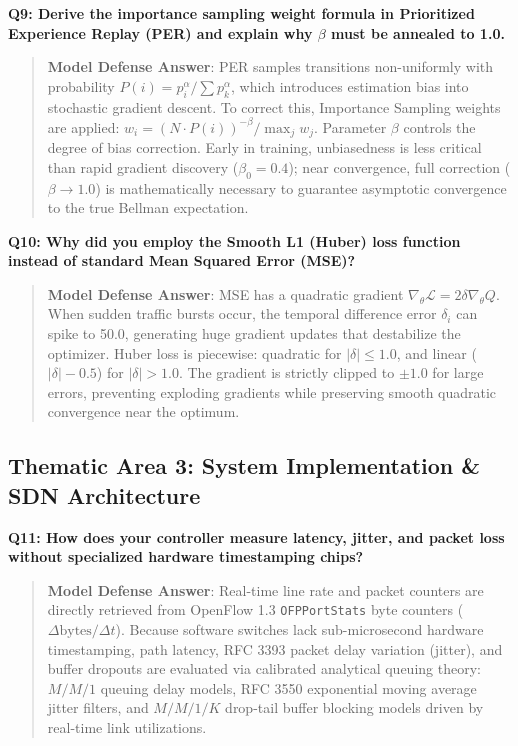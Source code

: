 \documentclass[12pt,a4paper,oneside]{report}
\begin{document}
\noindent\textbf{Q9: Derive the importance sampling weight formula in Prioritized Experience Replay (PER) and explain why $\beta$ must be annealed to 1.0.}
\begin{quote}
\small
\textbf{Model Defense Answer}: PER samples transitions non-uniformly with probability $P(i) = p_i^\alpha / \sum p_k^\alpha$, which introduces estimation bias into stochastic gradient descent. To correct this, Importance Sampling weights are applied: $w_i = (N \cdot P(i))^{-\beta} / \max_j w_j$. Parameter $\beta$ controls the degree of bias correction. Early in training, unbiasedness is less critical than rapid gradient discovery ($\beta_0 = 0.4$); near convergence, full correction ($\beta \to 1.0$) is mathematically necessary to guarantee asymptotic convergence to the true Bellman expectation.
\end{quote}

\noindent\textbf{Q10: Why did you employ the Smooth L1 (Huber) loss function instead of standard Mean Squared Error (MSE)?}
\begin{quote}
\small
\textbf{Model Defense Answer}: MSE has a quadratic gradient $\nabla_\theta \mathcal{L} = 2\delta \nabla_\theta Q$. When sudden traffic bursts occur, the temporal difference error $\delta_i$ can spike to 50.0, generating huge gradient updates that destabilize the optimizer. Huber loss is piecewise: quadratic for $|\delta| \le 1.0$, and linear ($|\delta| - 0.5$) for $|\delta| > 1.0$. The gradient is strictly clipped to $\pm 1.0$ for large errors, preventing exploding gradients while preserving smooth quadratic convergence near the optimum.
\end{quote}

\subsection{Thematic Area 3: System Implementation \& SDN Architecture}

\noindent\textbf{Q11: How does your controller measure latency, jitter, and packet loss without specialized hardware timestamping chips?}
\begin{quote}
\small
\textbf{Model Defense Answer}: Real-time line rate and packet counters are directly retrieved from OpenFlow 1.3 \texttt{OFPPortStats} byte counters ($\Delta \text{bytes} / \Delta t$). Because software switches lack sub-microsecond hardware timestamping, path latency, RFC 3393 packet delay variation (jitter), and buffer dropouts are evaluated via calibrated analytical queuing theory: $M/M/1$ queuing delay models, RFC 3550 exponential moving average jitter filters, and $M/M/1/K$ drop-tail buffer blocking models driven by real-time link utilizations.
\end{quote}
\end{document}
